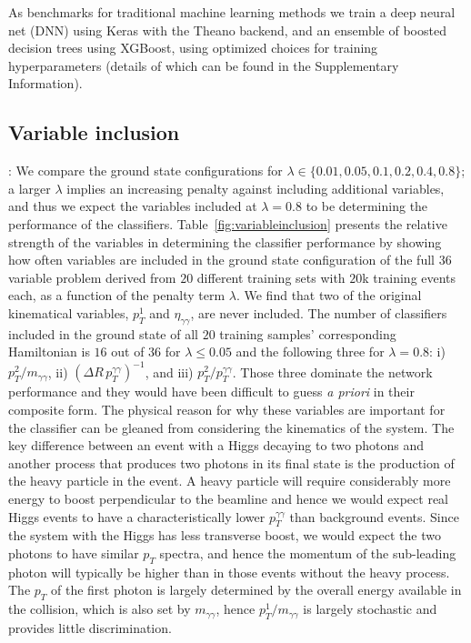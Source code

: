 \documentclass[.chapters/Higgs/.chapters/Higgs/main.tex]{subfiles}
\begin{document}
As benchmarks for traditional machine learning methods we train a deep neural net (DNN) using Keras\cite{keras} with the Theano backend,\cite{2016arXiv160502688full} and  an ensemble of boosted decision trees using XGBoost\cite{xgboost}, using optimized choices for training hyperparameters (details of which can be found in the Supplementary Information). 


\subsection*{Variable inclusion}:
We compare  the ground state configurations for $\lambda\in\{0.01,0.05,0.1,0.2,0.4,0.8\}$; a larger $\lambda$ implies an increasing penalty against including additional variables, and thus we expect the variables included at $\lambda=0.8$ to be determining the performance of the classifiers. Table~\ref{fig:variableinclusion} presents the relative strength of the variables in determining the classifier performance by showing how often variables are included in the ground state configuration of the full $36$ variable problem derived from $20$ different training sets with $20$k training events each, as a function of the penalty term $\lambda$.   We find that two of the original kinematical variables, $p_T^1$ and $\eta_{\gamma\gamma}$, are never included.  The number of classifiers included in the ground state of all $20$ training samples' corresponding Hamiltonian is $16$ out of $36$ for $\lambda\leq 0.05$ and the following three for $\lambda=0.8$: i) $p_T^2/m_{\gamma\gamma}$, ii) $(\Delta R\, p_T^{\gamma\gamma})^{-1}$, and iii) $p_T^2/p_T^{\gamma\gamma}$. Those three dominate the network performance and they would have been difficult to guess \textit{a priori} in their composite form.  The physical reason for why these variables are important for the classifier can be gleaned from considering the kinematics of the system.  The key difference between an event with a Higgs decaying to two photons and another process that produces two photons in its final state is the production of the heavy particle in the event.  A heavy particle will require considerably more energy to boost perpendicular to the beamline and hence we would expect real Higgs events to have a characteristically lower $p_{T}^{\gamma\gamma}$ than background events.  Since the system with the Higgs has less transverse boost, we would expect the two photons to have similar $p_T$ spectra, and hence the momentum of the sub-leading photon will typically be higher than in those events without the heavy process.  The $p_T$ of the first photon is largely determined by the overall energy available in the collision, which is also set by $m_{\gamma\gamma}$, hence $p_T^1/m_{\gamma\gamma}$ is largely stochastic and provides little discrimination.
\end{document}
